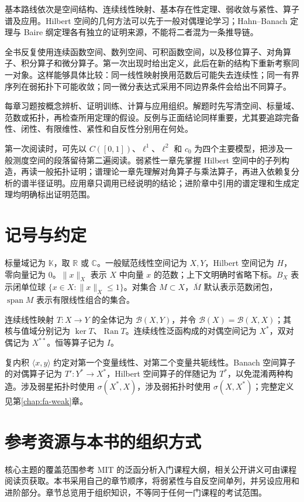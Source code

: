 基本路线依次是空间结构、连续线性映射、基本存在性定理、弱收敛与紧性、算子谱及应用。Hilbert 空间的几何方法可以先于一般对偶理论学习；Hahn--Banach 定理与 Baire 纲定理各有独立的证明来源，不能将二者混为一条推导链。

全书反复使用连续函数空间、数列空间、可积函数空间，以及移位算子、对角算子、积分算子和微分算子。第一次出现时给出定义，此后在新的结构下重新考察同一对象。这样能够具体比较：同一线性映射换用范数后可能失去连续性；同一有界序列在弱拓扑下可能收敛；同一微分表达式采用不同边界条件会给出不同算子。

每章习题按概念辨析、证明训练、计算与应用组织。解题时先写清空间、标量域、范数或拓扑，再检查所用定理的假设。反例与正面结论同样重要，尤其要追踪完备性、闭性、有限维性、紧性和自反性分别用在何处。

第一次阅读时，可先以 $C([0,1])$、$\ell^1$、$\ell^2$ 和 $c_0$ 为四个主要模型，把涉及一般测度空间的段落留待第二遍阅读。弱紧性一章先掌握 Hilbert 空间中的子列构造，再读一般拓扑证明；谱理论一章先理解对角算子与乘法算子，再进入依赖复分析的谱半径证明。应用章只调用已经说明的结论；进阶章中引用的谱定理和生成定理均明确标出证明范围。

\section{记号与约定}

标量域记为 $\mathbb K$，取 $\mathbb R$ 或 $\mathbb C$。一般赋范线性空间记为 $X,Y$，Hilbert 空间记为 $H$，零向量记为 $0$。$\|x\|_X$ 表示 $X$ 中向量 $x$ 的范数；上下文明确时省略下标。$B_X$ 表示闭单位球 $\{x\in X:\|x\|_X\leq 1\}$。对集合 $M\subset X$，$\overline M$ 默认表示范数闭包，$\operatorname{span}M$ 表示有限线性组合的集合。

连续线性映射 $T:X\to Y$ 的全体记为 $\mathcal B(X,Y)$，并令 $\mathcal B(X)=\mathcal B(X,X)$；其核与值域分别记为 $\ker T$、$\operatorname{Ran}T$。连续线性泛函构成的对偶空间记为 $X^*$，双对偶记为 $X^{**}$。恒等算子记为 $I$。

复内积 $\langle x,y\rangle$ 约定对第一个变量线性、对第二个变量共轭线性。Banach 空间算子的对偶算子记为 $T':Y^*\to X^*$，Hilbert 空间算子的伴随记为 $T^*$，以免混淆两种构造。涉及弱星拓扑时使用 $\sigma(X^*,X)$，涉及弱拓扑时使用 $\sigma(X,X^*)$；完整定义见第\ref{chap:fa-weak}章。

\section{参考资源与本书的组织方式}

核心主题的覆盖范围参考 MIT 的泛函分析入门课程大纲\cite{mit-syllabus}，相关公开讲义可由课程阅读页\cite{mit-notes}获取。本书采用自己的章节顺序，将弱紧性与自反空间单列，并另设应用和进阶部分。章节总览用于组织知识，不等同于任何一门课程的考试范围。

